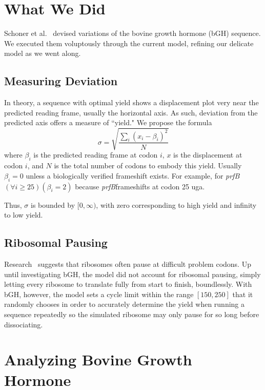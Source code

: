 \documentclass[10pt,twocolumn,draft]{article}
\newcommand{\prfB}{\emph{prfB}}
\begin{document}
\section{What We Did}
\label{whatwedid}

Schoner et al.~\cite{schoner:bgh} devised variations of the bovine growth hormone (bGH) sequence.
We executed them voluptously through the current model, refining our delicate model as we went along.

\subsection{Measuring Deviation}
\label{whatwedid:lbd}

In theory, a sequence with optimal yield shows a displacement plot very near the predicted reading frame, usually the horizontal axis.
As such, deviation from the predicted axis offers a measure of ``yield."
We propose the formula 
\begin{equation}
\label{eqn:lbd}
\sigma = \sqrt{\frac{\sum_i \left(x_i - \beta_i\right)^2}{N}}
\end{equation}
where $\beta_i$ is the predicted reading frame at codon $i$, $x$ is the displacement at codon $i$, and $N$ is the total number of codons
to embody this yield. 
Usually $\beta_i = 0$ unless a biologically verified frameshift exists. For example, for \prfB $(\forall i \geq 25)(\beta_i = 2)$
because \prfB frameshifts at codon 25 uga.

Thus, $\sigma$ is bounded by $[0,\infty)$, with zero corresponding to high yield and infinity to low yield.

\subsection{Ribosomal Pausing}
\label{rp}

Research~\cite{gowri:pause} suggests that ribosomes often pause at difficult problem codons. Up until investigating bGH, the model did not
account for ribosomal pausing, simply letting every ribosome to translate fully from start to finish, boundlessly. With
bGH, however, the model sets a cycle limit within the range $[150,250]$ that it randomly chooses in order to accurately
determine the yield when running a sequence repeatedly so the simulated ribosome may only pause for so long before dissociating.

\section{Analyzing Bovine Growth Hormone}
\end{document}
